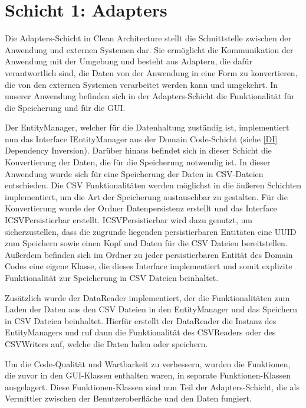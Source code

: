 \section{Schicht 1: Adapters}
Die Adapters-Schicht in Clean Architecture stellt die Schnittstelle zwischen der Anwendung und externen Systemen dar. Sie ermöglicht die Kommunikation der Anwendung mit der Umgebung und besteht aus Adaptern, die dafür verantwortlich sind, die Daten von der Anwendung in eine Form zu konvertieren, die von den externen Systemen verarbeitet werden kann und umgekehrt. In unserer Anwendung befinden sich in der Adapters-Schicht die Funktionalität für die Speicherung und für die GUI. 

Der EntityManager, welcher für die Datenhaltung zuständig ist, implementiert nun das Interface IEntityManager aus der Domain Code-Schicht (siehe \autoref{DI} Dependency Inversion). Darüber hinaus befindet sich in dieser Schicht die Konvertierung der Daten, die für die Speicherung notwendig ist. In dieser Anwendung wurde sich für eine Speicherung der Daten in CSV-Dateien entschieden. Die CSV Funktionalitäten werden möglichst in die äußeren Schichten implementiert, um die Art der Speicherung austauschbar zu gestalten. 
Für die Konvertierung wurde der Ordner Datenpersistenz erstellt und das Interface ICSVPersistierbar erstellt. ICSVPersistierbar wird dazu genutzt, um sicherzustellen, dass die zugrunde liegenden persistierbaren Entitäten eine UUID zum Speichern sowie einen Kopf und Daten für die CSV Dateien bereitstellen. Außerdem befinden sich im Ordner zu jeder persistierbaren Entität des Domain Codes eine eigene Klasse, die dieses Interface implementiert und somit explizite Funktionalität zur Speicherung in CSV Dateien beinhaltet. 

Zusätzlich wurde der DataReader implementiert, der die Funktionalitäten zum Laden der Daten aus den CSV Dateien in den EntityManager und das Speichern in CSV Dateien beinhaltet. Hierfür erstellt der DataReader die Instanz des EntityManagers und ruf dann die Funktionalität des CSVReaders oder des CSVWriters auf, welche die Daten laden oder speichern. 

Um die Code-Qualität und Wartbarkeit zu verbessern, wurden die Funktionen, die zuvor in den GUI-Klassen enthalten waren, in separate Funktionen-Klassen ausgelagert. Diese Funktionen-Klassen sind nun Teil der Adapters-Schicht, die als Vermittler zwischen der Benutzeroberfläche und den Daten fungiert.


